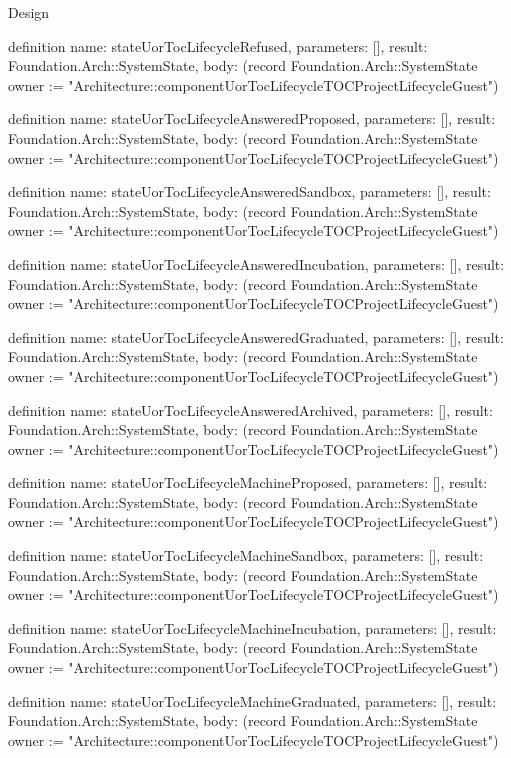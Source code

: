 \begin{lexlean}{Design}
\begin{semanticmodule}
definition{
  name: stateUorTocLifecycleRefused,
  parameters: [],
  result: Foundation.Arch::SystemState,
  body: (record Foundation.Arch::SystemState {owner := "Architecture::componentUorTocLifecycleTOCProjectLifecycleGuest"})
}

definition{
  name: stateUorTocLifecycleAnsweredProposed,
  parameters: [],
  result: Foundation.Arch::SystemState,
  body: (record Foundation.Arch::SystemState {owner := "Architecture::componentUorTocLifecycleTOCProjectLifecycleGuest"})
}

definition{
  name: stateUorTocLifecycleAnsweredSandbox,
  parameters: [],
  result: Foundation.Arch::SystemState,
  body: (record Foundation.Arch::SystemState {owner := "Architecture::componentUorTocLifecycleTOCProjectLifecycleGuest"})
}

definition{
  name: stateUorTocLifecycleAnsweredIncubation,
  parameters: [],
  result: Foundation.Arch::SystemState,
  body: (record Foundation.Arch::SystemState {owner := "Architecture::componentUorTocLifecycleTOCProjectLifecycleGuest"})
}

definition{
  name: stateUorTocLifecycleAnsweredGraduated,
  parameters: [],
  result: Foundation.Arch::SystemState,
  body: (record Foundation.Arch::SystemState {owner := "Architecture::componentUorTocLifecycleTOCProjectLifecycleGuest"})
}

definition{
  name: stateUorTocLifecycleAnsweredArchived,
  parameters: [],
  result: Foundation.Arch::SystemState,
  body: (record Foundation.Arch::SystemState {owner := "Architecture::componentUorTocLifecycleTOCProjectLifecycleGuest"})
}

definition{
  name: stateUorTocLifecycleMachineProposed,
  parameters: [],
  result: Foundation.Arch::SystemState,
  body: (record Foundation.Arch::SystemState {owner := "Architecture::componentUorTocLifecycleTOCProjectLifecycleGuest"})
}

definition{
  name: stateUorTocLifecycleMachineSandbox,
  parameters: [],
  result: Foundation.Arch::SystemState,
  body: (record Foundation.Arch::SystemState {owner := "Architecture::componentUorTocLifecycleTOCProjectLifecycleGuest"})
}

definition{
  name: stateUorTocLifecycleMachineIncubation,
  parameters: [],
  result: Foundation.Arch::SystemState,
  body: (record Foundation.Arch::SystemState {owner := "Architecture::componentUorTocLifecycleTOCProjectLifecycleGuest"})
}

definition{
  name: stateUorTocLifecycleMachineGraduated,
  parameters: [],
  result: Foundation.Arch::SystemState,
  body: (record Foundation.Arch::SystemState {owner := "Architecture::componentUorTocLifecycleTOCProjectLifecycleGuest"})
}


\end{semanticmodule}
\end{lexlean}
